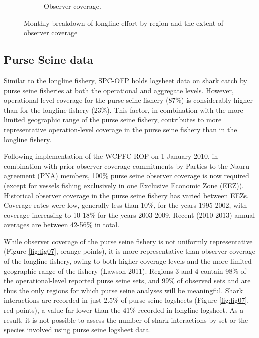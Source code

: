 \documentclass[12pt]{SCreport}
\begin{document}
\begin{landscape}
\begin{figure}
\begin{subfigure}[b]{0.6\textwidth}
       \caption{Observer coverage.}
       \label{fig:fig06b}
   \end{subfigure}
\caption{Monthly breakdown of longline effort by region and the extent of observer coverage}
\label{fig:fig06} 
\end{figure}
\end{landscape}

\clearpage
 
 
 \subsection{Purse Seine data} 
Similar to the longline fishery, SPC-OFP holds logsheet data on shark catch by purse seine fisheries at both the operational and aggregate levels.  However, operational-level coverage for the purse seine fishery (87\%) is considerably higher than for the longline fishery (23\%). This factor, in combination with the more limited geographic range of the purse seine fishery, contributes to more representative operation-level coverage in the purse seine fishery than in the longline fishery.

Following implementation of the WCPFC ROP on 1 January 2010, in combination with prior observer coverage commitments by Parties to the Nauru agreement (PNA) members, 100\% purse seine observer coverage is now required (except for vessels fishing exclusively in one Exclusive Economic Zone (EEZ)). Historical observer coverage in the purse seine fishery has varied between EEZs. Coverage rates were low, generally less than 10\%, for the years 1995-2002, with coverage increasing to 10-18\% for the years 2003-2009. Recent (2010-2013) annual averages are between 42-56\% in total.


While observer coverage of the purse seine fishery is not uniformly representative (Figure \ref{fig:fig07}, orange points), it is more representative than observer coverage of the longline fishery, owing to both higher coverage levels and the more limited geographic range of the fishery (Lawson 2011). Regions 3 and 4 contain 98\% of the operational-level reported purse seine sets, and 99\% of observed sets and are thus the only regions for which purse seine analyses will be meaningful. Shark interactions are recorded in just 2.5\% of purse-seine logsheets (Figure \ref{fig:fig07}, red points), a value far lower than the 41\% recorded in longline logsheet. As a result, it is not possible to assess the number of shark interactions by set or the species involved using purse seine logsheet data.
\end{document}
